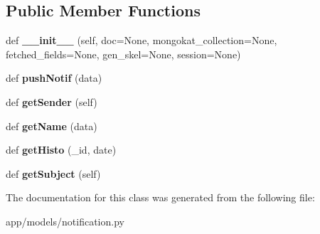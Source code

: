 \subsection*{Public Member Functions}
\begin{DoxyCompactItemize}
\item 
\mbox{\label{classapp_1_1models_1_1notification_1_1_notification_document_a16ecd1ed4756dfea9c364d0b4de13bfb}} 
def {\bfseries \+\_\+\+\_\+init\+\_\+\+\_\+} (self, doc=None, mongokat\+\_\+collection=None, fetched\+\_\+fields=None, gen\+\_\+skel=None, session=None)
\item 
\mbox{\label{classapp_1_1models_1_1notification_1_1_notification_document_a1d7d40ffadeb8360da8351b4ad5fa5f3}} 
def {\bfseries push\+Notif} (data)
\item 
\mbox{\label{classapp_1_1models_1_1notification_1_1_notification_document_aeb111cb48dafc0493cda16a4e79d648b}} 
def {\bfseries get\+Sender} (self)
\item 
\mbox{\label{classapp_1_1models_1_1notification_1_1_notification_document_a09741d59bdc60f1dee4ac369cad4b9bc}} 
def {\bfseries get\+Name} (data)
\item 
\mbox{\label{classapp_1_1models_1_1notification_1_1_notification_document_a11bd3921edeb393d236662852280e20c}} 
def {\bfseries get\+Histo} (\+\_\+id, date)
\item 
\mbox{\label{classapp_1_1models_1_1notification_1_1_notification_document_ac3f6d2003167290df6a96bf1e1d13a94}} 
def {\bfseries get\+Subject} (self)
\end{DoxyCompactItemize}


The documentation for this class was generated from the following file\+:\begin{DoxyCompactItemize}
\item 
app/models/notification.\+py\end{DoxyCompactItemize}
